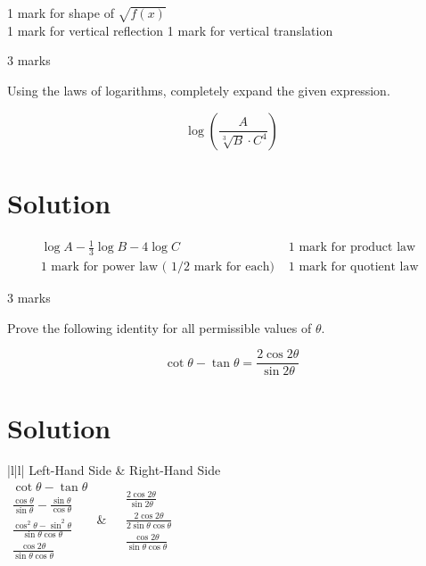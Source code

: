 \documentclass[10pt]{article}
\begin{document}
1 mark for shape of $\sqrt{f(x)}$\\
1 mark for vertical reflection 1 mark for vertical translation

3 marks

Using the laws of logarithms, completely expand the given expression.

$$
\log \left(\frac{A}{\sqrt[3]{B} \cdot C^{4}}\right)
$$

\section*{Solution}
$$
\begin{array}{ll}
\log A-\frac{1}{3} \log B-4 \log C & 1 \text { mark for product law } \\
1 \text { mark for power law ( } 1 / 2 \text { mark for each) } & 1 \text { mark for quotient law }
\end{array}
$$

3 marks

Prove the following identity for all permissible values of $\theta$.

$$
\cot \theta-\tan \theta=\frac{2 \cos 2 \theta}{\sin 2 \theta}
$$

\section*{Solution}
\begin{center}
\begin{tabular}{|l|l|}
\hline
Left-Hand Side & Right-Hand Side \\
\hline
\( \begin{gathered} \cot \theta-\tan \theta \\ \frac{\cos \theta}{\sin \theta}-\frac{\sin \theta}{\cos \theta} \\ \frac{\cos ^{2} \theta-\sin ^{2} \theta}{\sin \theta \cos \theta} \\ \frac{\cos 2 \theta}{\sin \theta \cos \theta} \end{gathered} \) & \( \begin{aligned} & \frac{2 \cos 2 \theta}{\sin 2 \theta} \\ & \frac{2 \cos 2 \theta}{2 \sin \theta \cos \theta} \\ & \frac{\cos 2 \theta}{\sin \theta \cos \theta} \end{aligned} \) \\
\hline
\end{tabular}
\end{center}
\end{document}
